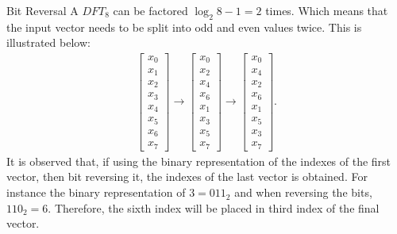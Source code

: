 \begin{example}{Bit Reversal}
    A $DFT_8$ can be factored $\log_2 8-1=2$ times. Which means that the input vector needs to be split into odd and even values twice. This is illustrated below:
    \begin{align*}
        \begin{bmatrix}
            x_0 \\
            x_1 \\
            x_2 \\
            x_3 \\
            x_4 \\
            x_5 \\
            x_6 \\
            x_7
        \end{bmatrix}
        \rightarrow
        \begin{bmatrix}
            x_0 \\
            x_2 \\
            x_4 \\
            x_6 \\
            x_1 \\
            x_3 \\
            x_5 \\
            x_7
        \end{bmatrix}
        \rightarrow
        \begin{bmatrix}
            x_0 \\
            x_4 \\
            x_2 \\
            x_6 \\
            x_1 \\
            x_5 \\
            x_3 \\
            x_7
        \end{bmatrix}.
    \end{align*}
    It is observed that, if using the binary representation of the indexes of the first vector, then bit reversing it, the indexes of the last vector is obtained. For instance the binary representation of $3=011_2$ and when reversing the bits, $110_2=6$. Therefore, the sixth index will be placed in third index of the final vector.
    

\end{example}
